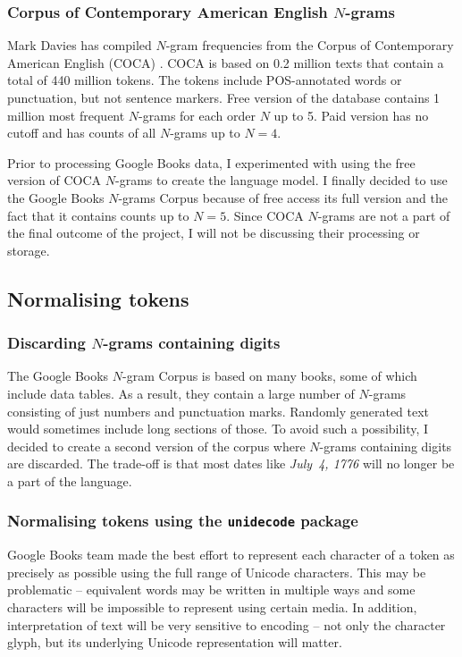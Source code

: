 \documentclass[draft]{IIBproject}
\begin{document}
\subsubsection{Corpus of Contemporary American English $N$-grams}

Mark Davies has compiled $N$-gram frequencies \cite{web:byu_ngrams} from the Corpus of Contemporary American English (COCA) \cite{coca2010}. COCA is based on 0.2 million texts that contain a total of 440 million tokens. The tokens include POS-annotated words or punctuation, but not sentence markers. Free version of the database contains 1 million most frequent $N$-grams for each order $N$ up to 5. Paid version has no cutoff and has counts of all $N$-grams up to $N=4$.

Prior to processing Google Books data, I experimented with using the free version of COCA $N$-grams to create the language model. I finally decided to use the Google Books $N$-grams Corpus because of free access its full version and the fact that it contains counts up to $N=5$. Since COCA $N$-grams are not a part of the final outcome of the project, I will not be discussing their processing or storage.

\FloatBarrier
\subsection{Normalising tokens}

\subsubsection{Discarding $N$-grams containing digits}

The Google Books $N$-gram Corpus is based on many books, some of which include data tables. As a result, they contain a large number of $N$-grams consisting of just numbers and punctuation marks. Randomly generated text would sometimes include long sections of those. To avoid such a possibility, I decided to create a second version of the corpus where $N$-grams containing digits are discarded. The trade-off is that most dates like \emph{July~4, 1776} will no longer be a part of the language.

\subsubsection{Normalising tokens using the \texttt{unidecode} package}

Google Books team made the best effort to represent each character of a token as precisely as possible using the full range of Unicode characters. This may be problematic -- equivalent words may be written in multiple ways and some characters will be impossible to represent using certain media. In addition, interpretation of text will be very sensitive to encoding -- not only the character glyph, but its underlying Unicode representation will matter.
\end{document}
